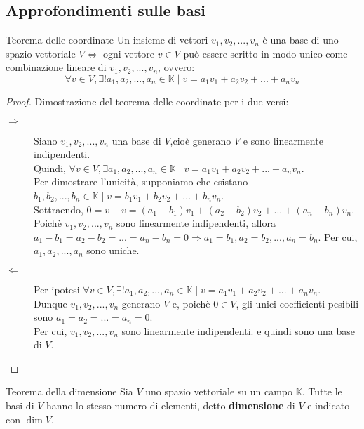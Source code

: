 \documentclass[a4paper]{article}
\theoremstyle{definition}
\begin{document}
\subsection{Approfondimenti sulle basi}
\begin{teo}{Teorema delle coordinate}{}
	Un insieme di vettori $v_1, v_2, ..., v_n$ è una base di uno spazio vettoriale $V \Leftrightarrow$ ogni vettore $v \in V$ può essere scritto in modo unico come combinazione lineare di $v_1, v_2, ..., v_n$, ovvero:
	\begin{equation*}
		\forall v \in V, \exists! a_1, a_2, ..., a_n \in \mathbb{K} \mid v = a_1v_1 + a_2v_2 + ... + a_nv_n
	\end{equation*}
\end{teo}
\begin{proof}
	Dimostrazione del teorema delle coordinate per i due versi:
	\begin{description}
		\item[$\Rightarrow$] Siano $v_1, v_2, ..., v_n$ una base di $V$,cioè generano $V$ e sono linearmente indipendenti. \\
		      Quindi, $\forall v \in V, \exists a_1, a_2, ..., a_n \in \mathbb{K} \mid v = a_1v_1 + a_2v_2 + ... + a_nv_n$. \\
		      Per dimostrare l'unicità, supponiamo che esistano $b_1, b_2, ..., b_n \in \mathbb{K} \mid v = b_1v_1 + b_2v_2 + ... + b_nv_n$. \\
		      Sottraendo, $0 = v - v = (a_1 - b_1)v_1 + (a_2 - b_2)v_2 + ... + (a_n - b_n)v_n$. \\
		      Poichè $v_1, v_2, ..., v_n$ sono linearmente indipendenti, allora $a_1 - b_1 = a_2 - b_2 = ... = a_n - b_n = 0 \Rightarrow a_1 = b_1, a_2 = b_2, ..., a_n = b_n$.
		      Per cui, $a_1, a_2, ..., a_n$ sono uniche.
		\item[$\Leftarrow$] Per ipotesi $\forall v \in V, \exists! a_1, a_2, ..., a_n \in \mathbb{K} \mid v = a_1v_1 + a_2v_2 + ... + a_nv_n$. \\
		      Dunque $v_1, v_2, ..., v_n$ generano $V$ e, poichè $0 \in V$, gli unici coefficienti pesibili sono $a_1 = a_2 = ... = a_n = 0$. \\
		      Per cui, $v_1, v_2, ..., v_n$ sono linearmente indipendenti. e quindi sono una base di $V$.
	\end{description}
\end{proof}
\begin{teo}{Teorema della dimensione}{}
	Sia $V$ uno spazio vettoriale su un campo $\mathbb{K}$. Tutte le basi di $V$ hanno lo stesso numero di elementi, detto \textbf{dimensione} di $V$ e indicato con $\dim V$.
\end{teo}
\end{document}

